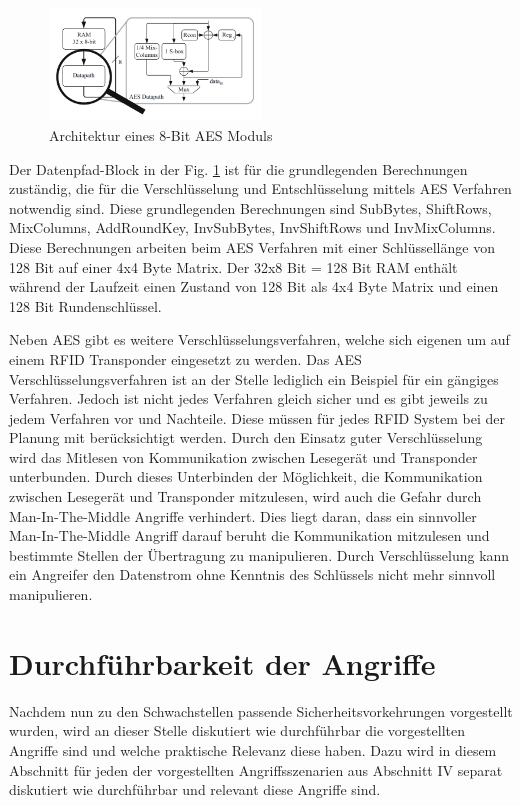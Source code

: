 \documentclass[conference]{IEEEtran}
\begin{document}
\begin{figure}[htbp]
\centerline{\includegraphics[width=0.5\textwidth]{img/AES.png}}
\caption{Architektur eines 8-Bit AES Moduls \cite{b9}}
\label{fig6}
\end{figure}

Der Datenpfad-Block in der Fig. \ref{fig6} ist für die grundlegenden Berechnungen zuständig, die für die Verschlüsselung und Entschlüsselung mittels AES Verfahren notwendig sind. Diese grundlegenden Berechnungen sind SubBytes, ShiftRows, MixColumns, AddRoundKey, InvSubBytes,  InvShiftRows und InvMixColumns. Diese Berechnungen arbeiten beim AES Verfahren mit einer Schlüssellänge von 128 Bit auf einer 4x4 Byte Matrix. Der 32x8 Bit = 128 Bit RAM enthält während der Laufzeit einen Zustand von 128 Bit als 4x4 Byte Matrix und einen 128 Bit Rundenschlüssel.

Neben AES gibt es weitere Verschlüsselungsverfahren, welche sich eigenen um auf einem RFID Transponder eingesetzt zu werden. Das AES Verschlüsselungsverfahren ist an der Stelle lediglich ein Beispiel für ein gängiges Verfahren. Jedoch ist nicht jedes Verfahren gleich sicher und es gibt jeweils zu jedem Verfahren vor und Nachteile. Diese müssen für jedes RFID System bei der Planung mit berücksichtigt werden. Durch den Einsatz guter Verschlüsselung wird das Mitlesen von Kommunikation zwischen Lesegerät und Transponder unterbunden. Durch dieses Unterbinden der Möglichkeit, die Kommunikation zwischen Lesegerät und Transponder mitzulesen, wird auch die Gefahr durch Man-In-The-Middle Angriffe verhindert. Dies liegt daran, dass ein sinnvoller Man-In-The-Middle Angriff darauf beruht die Kommunikation mitzulesen und bestimmte Stellen der Übertragung zu manipulieren. Durch Verschlüsselung kann ein Angreifer den Datenstrom ohne Kenntnis des Schlüssels nicht mehr sinnvoll manipulieren.

\section{Durchführbarkeit der Angriffe}
Nachdem nun zu den Schwachstellen passende Sicherheitsvorkehrungen vorgestellt wurden, wird an dieser Stelle diskutiert wie durchführbar die vorgestellten Angriffe sind und welche praktische Relevanz diese haben. Dazu wird in diesem Abschnitt für jeden der vorgestellten Angriffsszenarien aus Abschnitt IV separat diskutiert wie durchführbar und relevant diese Angriffe sind.
\end{document}
